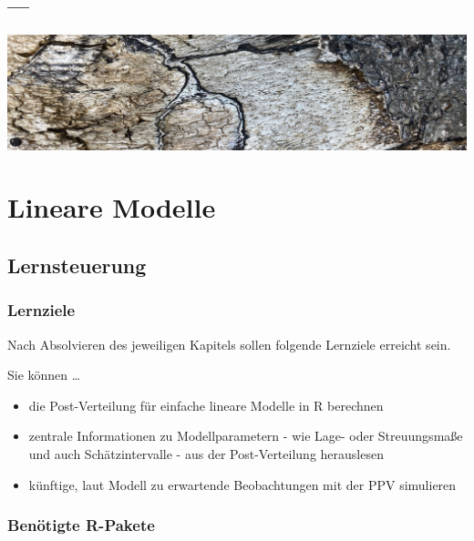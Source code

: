 \documentclass[
  a4paper,
  DIV=11]{scrreprt}
\providecommand{\tightlist}{%
  \setlength{\itemsep}{0pt}\setlength{\parskip}{0pt}}\usepackage{longtable,booktabs,array}
\theoremstyle{definition}
\theoremstyle{remark}
\begin{document}
\hypertarget{section-7}{%
\section{---}\label{section-7}}

\includegraphics[width=1\textwidth,height=\textheight]{./img/outro-08.jpg}


\hypertarget{lineare-modelle}{%
\chapter{Lineare Modelle}\label{lineare-modelle}}

\hypertarget{lernsteuerung-7}{%
\section{Lernsteuerung}\label{lernsteuerung-7}}

\hypertarget{lernziele-8}{%
\subsection{Lernziele}\label{lernziele-8}}

Nach Absolvieren des jeweiligen Kapitels sollen folgende Lernziele
erreicht sein.

Sie können \ldots{}

\begin{itemize}
\tightlist
\item
  die Post-Verteilung für einfache lineare Modelle in R berechnen
\item
  zentrale Informationen zu Modellparametern - wie Lage- oder
  Streuungsmaße und auch Schätzintervalle - aus der Post-Verteilung
  herauslesen
\item
  künftige, laut Modell zu erwartende Beobachtungen mit der PPV
  simulieren
\end{itemize}

\hypertarget{benuxf6tigte-r-pakete-5}{%
\subsection{Benötigte R-Pakete}\label{benuxf6tigte-r-pakete-5}}
\end{document}
